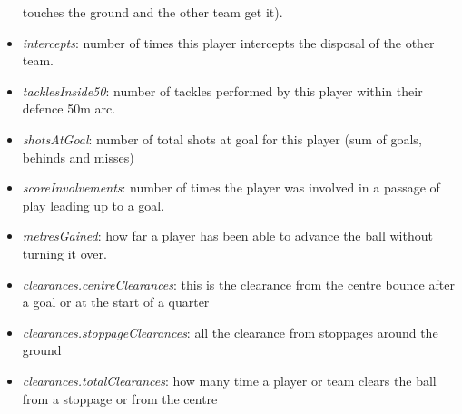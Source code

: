 \begin{itemize}
  touches the ground and the other team get it).\\
\item
  \emph{intercepts}: number of times this player intercepts the disposal
  of the other team.
\item
  \emph{tacklesInside50}: number of tackles performed by this player
  within their defence 50m arc.\\
\item
  \emph{shotsAtGoal}: number of total shots at goal for this player (sum
  of goals, behinds and misses)
\item
  \emph{scoreInvolvements}: number of times the player was involved in a
  passage of play leading up to a goal.
\item
  \emph{metresGained}: how far a player has been able to advance the
  ball without turning it over.\\
\item
  \emph{clearances.centreClearances}: this is the clearance from the
  centre bounce after a goal or at the start of a quarter
\item
  \emph{clearances.stoppageClearances}: all the clearance from stoppages
  around the ground
\item
  \emph{clearances.totalClearances}: how many time a player or team
  clears the ball from a stoppage or from the centre
\end{itemize}

\begin{verbatim}
\end{verbatim}



\address{%
Harriet Mason\\
Monash University\\%
Department of Econometrics and Business Statistics\\ Melbourne,
Australia\\
%
\url{https://www.britannica.com/animal/quokka}\\%
\textit{ORCiD: \href{https://orcid.org/0000-1721-1511-1101}{0000-1721-1511-1101}}\\%
\href{mailto:hmas0003@student.monash.edu}{\nolinkurl{hmas0003@student.monash.edu}}%
}

\address{%
Stuart Lee\\
Genentech\\%
\\
%
\url{https://stuartlee.org}\\%
\textit{ORCiD: \href{https://orcid.org/0000-0003-1179-8436}{0000-0003-1179-8436}}\\%
\href{mailto:stuart.andrew.lee@gmail.com}{\nolinkurl{stuart.andrew.lee@gmail.com}}%
}

